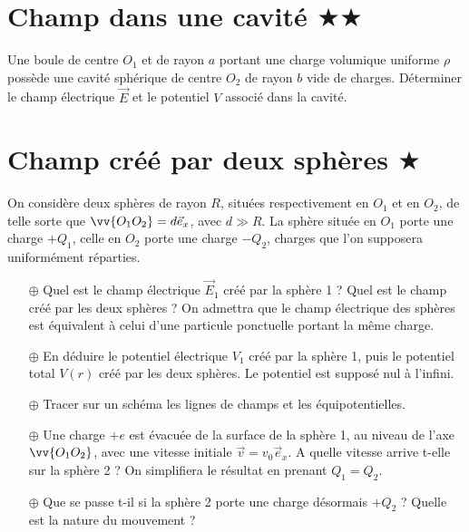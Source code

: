 \documentclass{report}
\begin{document}
\newpage

\section*{Champ dans une cavité $\bigstar\bigstar$}


Une boule de centre $O_1$ et de rayon $a$ portant une charge volumique uniforme $\rho$ possède une cavité sphérique de centre $O_2$ de rayon $b$ vide de charges. Déterminer le champ électrique $\vec{E}$ et le potentiel $V$ associé dans la cavité.

\newpage

\section*{Champ créé par deux sphères $\bigstar$}

On considère deux sphères de rayon $R$, situées respectivement en $O_1$ et en $O_2$, de telle sorte que $\vv{O_1O_2}=d\vec{e}_x$, avec $d\gg R$. La sphère située en $O_1$ porte une charge $+Q_1$, celle en $O_2$ porte une charge $-Q_2$, charges que l'on supposera uniformément réparties. 

\begin{itemize}

	\item[$\oplus$] Quel est le champ électrique $\vec{E}_1$ créé par la sphère 1 ? Quel est le champ créé par les deux sphères ? On admettra que le champ électrique des sphères est équivalent à celui d'une particule ponctuelle portant la même charge.
	
	\item[$\oplus$] En déduire le potentiel électrique $V_1$ créé par la sphère 1, puis le potentiel total $V(r)$ créé par les deux sphères. Le potentiel est supposé nul à l'infini.
	
	\item[$\oplus$] Tracer sur un schéma les lignes de champs et les équipotentielles. 
	
	\item[$\oplus$] Une charge $+e$ est évacuée de la surface de la sphère 1, au niveau de l'axe $\vv{O_1O_2}$, avec une vitesse initiale $\vec{v}=v_0\vec{e}_x$. A quelle vitesse arrive t-elle sur la sphère 2 ?  On simplifiera le résultat en prenant $Q_1=Q_2$.
	
	\item[$\oplus$] Que se passe t-il si la sphère 2 porte une charge désormais $+Q_2$ ? Quelle est la nature du mouvement ?

\end{itemize}
\end{document}

